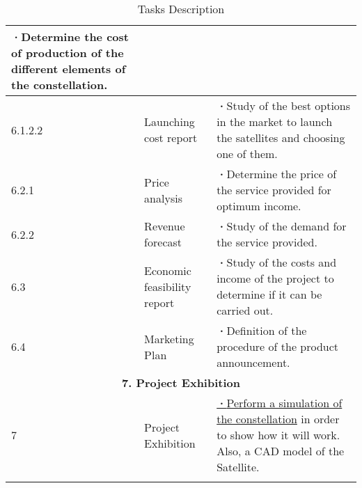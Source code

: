 \begin{longtable}{ | p{1.3cm} | p{3cm} | p{11cm} |}
\textbf{·}Determine the cost of production of the different elements of the constellation.\\ 
\hline
6.1.2.2 & Launching cost report & 
\textbf{·}Study of the best options in the market to launch the satellites and choosing one of them.\\ 
\hline
6.2.1 & Price analysis &   
\textbf{·}Determine the price of the service provided for optimum income.\\ 
\hline
6.2.2 & Revenue forecast & 
\textbf{·}Study of the demand for the service provided.\\ 
\hline
6.3 & Economic feasibility report & 
\textbf{·}Study of the costs and income of the project to determine if it can be carried out.\\ 
 \hline
6.4 & Marketing Plan & 
\textbf{·}Definition of the procedure of the product announcement.\\ 
 \hline
 \multicolumn{3}{|c|}{\textbf{7. Project Exhibition}} \\ \hline
7 & Project Exhibition & 

\underline{\textbf{·}Perform a simulation of the constellation} in order to show how it will work. Also, a CAD model of the Satellite. \\ \hline
\caption{Tasks Description} \\
\end{longtable}